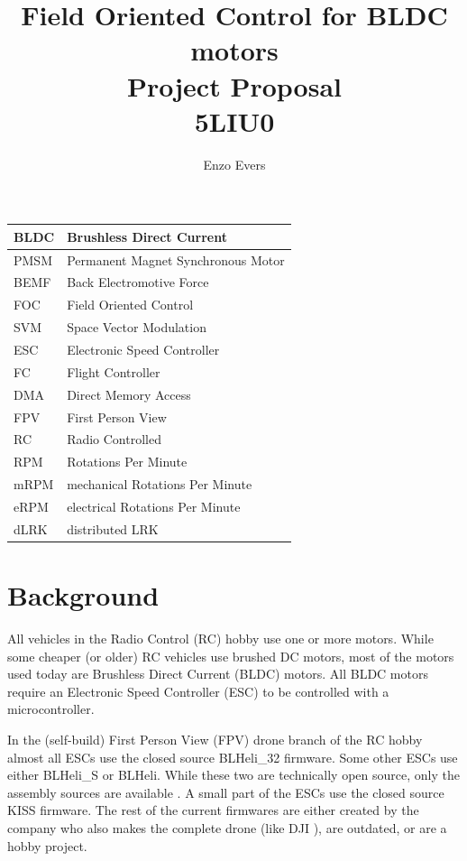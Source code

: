 \documentclass[]{report}
\title{	\huge Field Oriented Control for BLDC motors \\
		\large Project Proposal \\ 5LIU0}
\author{Enzo Evers}
\begin{document}
\maketitle
\tableofcontents

\newpage

\begin{tabular}{|l|l|}
	\hline
	BLDC & Brushless Direct Current \\
	\hline
	PMSM & Permanent Magnet Synchronous Motor \\
	\hline
	BEMF & Back Electromotive Force \\
	\hline
	FOC & Field Oriented Control \\
	\hline
	SVM & Space Vector Modulation \\
	\hline
	ESC & Electronic Speed Controller \\
	\hline
	FC & Flight Controller \\
	\hline
	DMA & Direct Memory Access \\
	\hline
	FPV & First Person View \\
	\hline
	RC & Radio Controlled \\
	\hline
	RPM & Rotations Per Minute \\
	\hline
	mRPM & mechanical Rotations Per Minute \\
	\hline
	eRPM & electrical Rotations Per Minute \\
	\hline
	dLRK & distributed LRK \\
	\hline
\end{tabular}

\newpage

\chapter{Background}
All vehicles in the Radio Control (RC) hobby use one or more motors. While some cheaper (or older) RC vehicles use brushed DC motors, most of the motors used today are Brushless Direct Current (BLDC) motors. All BLDC motors require an Electronic Speed Controller (ESC) to be controlled with a microcontroller.

In the (self-build) First Person View (FPV) drone branch of the RC hobby almost all ESCs use the closed source BLHeli\_32 \cite{BLHeli_Git} firmware. Some other ESCs use either BLHeli\_S or BLHeli. While these two are technically open source, only the assembly sources are available \cite{BLHeli_Git}. A small part of the ESCs use the closed source KISS \cite{KISS_website} firmware. The rest of the current firmwares are either created by the company who also makes the complete drone (like DJI \cite{DJI_website}), are outdated, or are a hobby project.
\end{document}
